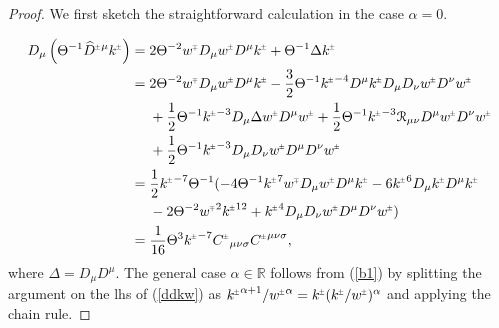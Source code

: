 \documentclass[a4paper,11pt,reqno]{amsart}
\newcommand{\cR}{\mathcal{R}}
\newcommand{\wh}{\widehat}
\newcommand{\Th}{\Theta}
\newcommand{\al}{\alpha}
\newcommand{\si}{\sigma}
\theoremstyle{plain}
\newcommand{\PM}[1]{{{#1}^{\hspace{-.5pt}\scaleto{\pm}{3.5pt}}}}
\newcommand{\MP}[1]{{{#1}^{\hspace{-.5pt}\scaleto{\mp}{3.5pt}}}}
\numberwithin{equation}{section}
\begin{document}
\begin{proof}
We  first sketch the straightforward calculation in the case $\al = 0$.


\begin{align}
\label{b1} 
D_{\mu} \left( \Th^{-1}  \PM{\wh D}{}^{\mu} \PM{k} \right) ={}& 2 \Th^{-2} \MP{w}D_{\mu} \PM{w} D^{\mu} \PM{k} + \Th^{-1} \Delta \PM{k}  \nonumber \\
={}& 2 \Th^{-2} \MP{w} D_{\mu} \PM{w} D^{\mu} \PM{k} -
 \frac{3}{2} \Th^{-1} \PM{k}^{-4} D^{\mu} \PM{k} D_{\mu} D_{\nu} \PM{w} D^{\nu} \PM{w} \nonumber \\
 & +\frac{1}{2} \Th^ {-1} \PM{k}^{-3} D_{\mu}\Delta \PM{w} D^{\mu} \PM{w} + 
 \frac{1}{2} \Theta^{-1} \PM{k}^{-3} \cR_{\mu\nu} D^{\mu} \PM{w} D^{\nu} \PM{w} \nonumber \\
 &  + \frac{1}{2} \Theta^{-1} \PM{k}^{-3}  D_{\mu}D_{\nu} \PM{w}D^{\mu} D^{\nu} \PM{w}  \nonumber \\
 ={}& \frac{1}{2} \PM{k}^{-7} \Theta^ {-1} (-4 \Theta^{-1} \PM{k}^7 \MP{w} D_{\mu} \PM{w} D^{\mu} \PM{k} - 
 6 \PM{k}^6  D_{\mu} \PM{k} D^{\mu} \PM{k}  \nonumber  \\
 &  - 2 \Theta^{-2} \MP{w}^2 \PM{k}^{12} + \PM{k}^4 D_{\mu} D_{\nu} \PM{w} D^{\mu} D^{\nu} \PM{w} ) 
  \nonumber \\
 ={}& \frac{1}{16} \Theta^3 \PM{k}^{-7} \PM{C}_{\mu\nu\si} \PM{C}^{\mu\nu\si},
 \end{align}
where $ \Delta = D_{\mu} D^{\mu}$. The general case  $\al \in \mathbb{R}$  follows  from (\ref{b1}) by splitting the argument on the lhs of (\ref{ddkw})  as  
$\PM{k}^{\al + 1} / \PM{w}^{\al} =  \PM{k} (\PM{k} / \PM{w})^{\al}$ and applying the chain rule.
\end{proof} 
\end{document}
